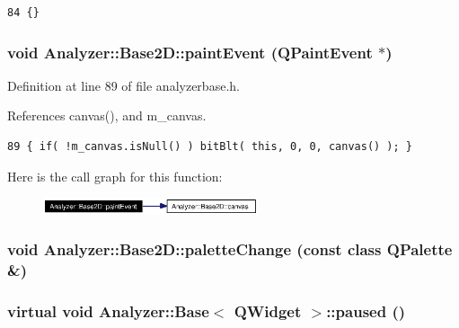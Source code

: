 \footnotesize\begin{verbatim}84 {}
\end{verbatim}\normalsize 
{}
\subsubsection{\setlength{\rightskip}{0pt plus 5cm}void Analyzer::Base2D::paint\-Event (QPaint\-Event $\ast$)\hspace{0.3cm}{\tt  [inline, protected]}}\label{classAnalyzer_1_1Base2D_Sonogramb2}




Definition at line 89 of file analyzerbase.h.

References canvas(), and m\_\-canvas.



\footnotesize\begin{verbatim}89 { if( !m_canvas.isNull() ) bitBlt( this, 0, 0, canvas() ); }
\end{verbatim}\normalsize 


Here is the call graph for this function:\begin{figure}[H]
\begin{center}
\leavevmode
\includegraphics[width=179pt]{classAnalyzer_1_1Base2D_Sonogramb2_cgraph}
\end{center}
\end{figure}
\subsubsection{\setlength{\rightskip}{0pt plus 5cm}void Analyzer::Base2D::palette\-Change (const class QPalette \&)\hspace{0.3cm}{\tt  [protected]}}\label{classAnalyzer_1_1Base2D_Sonogramb4}


\subsubsection{\setlength{\rightskip}{0pt plus 5cm}virtual void {\bf Analyzer::Base}$<$ {\bf QWidget}  $>$::paused ()\hspace{0.3cm}{\tt  [protected, virtual, inherited]}}\label{classAnalyzer_1_1Base_Analyzer_1_1Baseb4}


